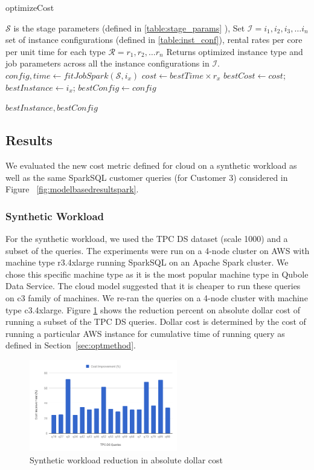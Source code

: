 \begin{algorithm}
\caption{optimizeCost} \label{cost_optimize}
\begin{algorithmic}[1]
\footnotesize
\REQUIRE $\mathcal{S}$ is the stage parameters (defined in \ref{table:stage_params} ), Set $\mathcal{I} = {i_1, i_2, i_3, \ldots i_n} $ set of instance configurations (defined in \ref{table:inst_conf}), rental rates per core per unit time for each type $\mathcal{R}={r_1, r_2, \ldots r_n}$
\ENSURE Returns optimized instance type and job parameters across all the instance configurations in $\mathcal{I}$.
	\STATE $config, time \gets fitJobSpark(\mathcal{S}, i_x)$
	\STATE $cost \gets  bestTime \times r_x$  
		\STATE $bestCost \gets cost$;
		$bestInstance \gets i_x$;
		$bestConfig \gets config$
	\ENDIF
\ENDFOR

\RETURN $bestInstance, bestConfig$
\end{algorithmic}
\end{algorithm}

\subsection{Results}

We evaluated the new cost metric defined for cloud on a synthetic workload as well as the same SparkSQL customer queries (for Customer 3) considered in Figure ~\ref{fig:modelbasedresultspark}. 

\subsubsection*{Synthetic Workload}
For the synthetic workload, we used the TPC DS dataset (scale 1000) and a subset of the queries. The experiments
were run on a 4-node cluster on AWS with machine type r3.4xlarge running SparkSQL on an Apache Spark cluster. We chose this specific machine type as it is the 
most popular machine type in Qubole Data Service. The cloud model suggested that it is cheaper to run these 
queries on c3 family of machines. We re-ran the queries on a 4-node cluster with machine type c3.4xlarge. 
Figure \ref{fig:syntheticcloudmodel} shows the reduction percent on absolute dollar cost of running a subset of the
TPC DS queries. Dollar cost is determined by the cost of running a particular AWS instance for cumulative time of running query as defined in Section~\ref{sec:optmethod}.
\begin{figure}[h]
	\centering\includegraphics[height=4cm]{CloudSyn.png}
	\caption{Synthetic workload reduction in absolute dollar cost}
	\label{fig:syntheticcloudmodel}
\end{figure}

